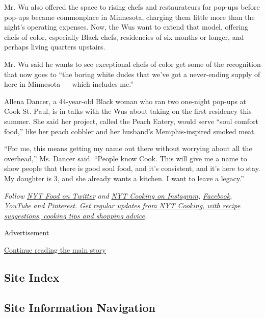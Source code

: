 Mr. Wu also offered the space to rising chefs and restaurateurs for
pop-ups before pop-ups became commonplace in Minnesota, charging them
little more than the night's operating expenses. Now, the Wus want to
extend that model, offering chefs of color, especially Black chefs,
residencies of six months or longer, and perhaps living quarters
upstairs.

Mr. Wu said he wants to see exceptional chefs of color get some of the
recognition that now goes to ``the boring white dudes that we've got a
never-ending supply of here in Minnesota --- which includes me.''

Allena Dancer, a 44-year-old Black woman who ran two one-night pop-ups
at Cook St. Paul, is in talks with the Wus about taking on the first
residency this summer. She said her project, called the Peach Eatery,
would serve ``soul comfort food,'' like her peach cobbler and her
husband's Memphis-inspired smoked meat.

``For me, this means getting my name out there without worrying about
all the overhead,'' Ms. Dancer said. ``People know Cook. This will give
me a name to show people that there is good soul food, and it's
consistent, and it's here to stay. My daughter is 3, and she already
wants a kitchen. I want to leave a legacy.''

\emph{Follow} \href{https://twitter.com/nytfood}{\emph{NYT Food on
Twitter}} \emph{and}
\href{https://www.instagram.com/nytcooking/}{\emph{NYT Cooking on
Instagram}}\emph{,}
\href{https://www.facebookcorewwwi.onion/nytcooking/}{\emph{Facebook}}\emph{,}
\href{https://www.youtube.com/nytcooking}{\emph{YouTube}} \emph{and}
\href{https://www.pinterest.com/nytcooking/}{\emph{Pinterest}}\emph{.}
\href{https://www.nytimes3xbfgragh.onion/newsletters/cooking}{\emph{Get
regular updates from NYT Cooking, with recipe suggestions, cooking tips
and shopping advice}}\emph{.}

Advertisement

\protect\hyperlink{after-bottom}{Continue reading the main story}

\hypertarget{site-index}{%
\subsection{Site Index}\label{site-index}}

\hypertarget{site-information-navigation}{%
\subsection{Site Information
Navigation}\label{site-information-navigation}}

